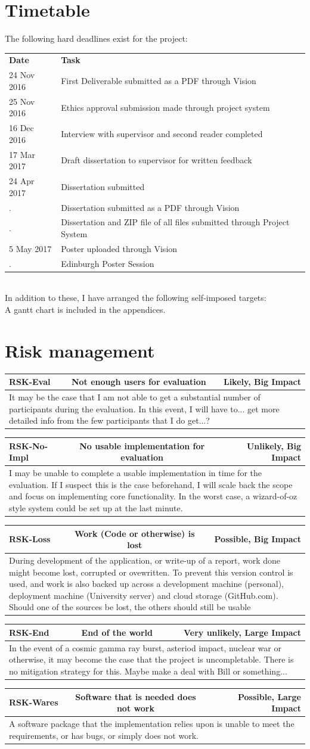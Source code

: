 \documentclass[a4paper,11pt]{report}
\newcommand{\riskitem}[4]{\begin{tabularx}{\textwidth}{|l|cr|} \hline \textbf{RSK-#1} & #2 & #3 \\ \hline \multicolumn{3}{|X|}{#4} \\ \hline \end{tabularx}}
\begin{document}
\section{Timetable}
The following hard deadlines exist for the project:\\
\begin{tabularx}{\textwidth}{lX}
\textbf{Date} & \textbf{Task}\\
24 Nov 2016 & First Deliverable submitted as a PDF through Vision\\
25 Nov 2016 & Ethics approval submission made through project system\\
16 Dec 2016 & Interview with supervisor and second reader completed\\
17 Mar 2017 & Draft dissertation to supervisor for written feedback\\
24 Apr 2017 & Dissertation submitted\\
. & Dissertation submitted as a PDF through Vision\\
. & Dissertation and ZIP file of all files submitted through Project System\\
 5 May 2017 & Poster uploaded through Vision\\
. & Edinburgh Poster Session
\end{tabularx}\\
In addition to these, I have arranged the following self-imposed targets:\\
A gantt chart is included in the appendices.
\section{Risk management}
\riskitem{Eval}{Not enough users for evaluation}{Likely, Big Impact}{It may be the case that I am not able to get a substantial number of participants during the evaluation. In this event, I will have to... get more detailed info from the few participants that I do get...?}
\riskitem{No-Impl}{No usable implementation for evaluation}{Unlikely, Big Impact}{I may be unable to complete a usable implementation in time for the evaluation. If I suspect this is the case beforehand, I will scale back the scope and focus on implementing core functionality. In the worst case, a wizard-of-oz style system could be set up at the last minute.}
\riskitem{Loss}{Work (Code or otherwise) is lost}{Possible, Big Impact}{During development of the application, or write-up of a report, work done might become lost, corrupted or ovewritten. To prevent this version control is used, and work is also backed up across a development machine (personal), deployment machine (University server) and cloud storage (GitHub.com). Should one of the sources be lost, the others should still be usable}
\riskitem{End}{End of the world}{Very unlikely, Large Impact}{In the event of a cosmic gamma ray burst, asteriod impact, nuclear war or otherwise, it may become the case that the project is uncompletable. There is no mitigation strategy for this. Maybe make a deal with Bill or something...}
\riskitem{Wares}{Software that is needed does not work}{Possible, Large Impact}{A software package that the implementation relies upon is unable to meet the requirements, or has bugs, or simply does not work.}
\end{document}
